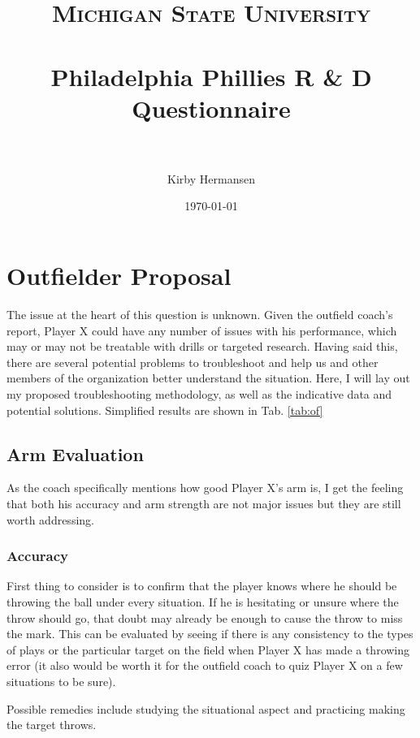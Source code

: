 \documentclass[paper=a4, fontsize=11pt]{scrartcl} %
\title{	
\normalfont \normalsize 
\textsc{Michigan State University} \\ [25pt] %
\horrule{0.5pt} \\[0.4cm] %
\huge Philadelphia Phillies R \& D Questionnaire \\ %
\horrule{2pt} \\[0.5cm] %
}
\author{Kirby Hermansen} %
\date{\normalsize\today} %
\numberwithin{equation}{section} %
\numberwithin{figure}{section} %
\numberwithin{table}{section} %
\numberwithin{equation}{subsection}
\begin{document}
\maketitle %



\section{Outfielder Proposal}

The issue at the heart of this question is unknown. Given the outfield coach's report, Player X could have any number of issues with his performance, which may or may not be treatable with drills or targeted research. Having said this, there are several potential problems to troubleshoot and help us and other members of the organization better understand the situation. Here, I will lay out my proposed troubleshooting methodology, as well as the indicative data and potential solutions. Simplified results are shown in Tab. \ref{tab:of}

\subsection{Arm Evaluation}

As the coach specifically mentions how good Player X's arm is, I get the feeling that both his accuracy and arm strength are not major issues but they are still worth addressing.

\subsubsection{Accuracy}

First thing to consider is to confirm that the player knows where he should be throwing the ball under every situation. If he is hesitating or unsure where the throw should go, that doubt may already be enough to cause the throw to miss the mark. This can be evaluated by seeing if there is any consistency to the types of plays or the particular target on the field when Player X has made a throwing error (it also would be worth it for the outfield coach to quiz Player X on a few situations to be sure). 

Possible remedies include studying the situational aspect and practicing making the target throws.
\end{document}

